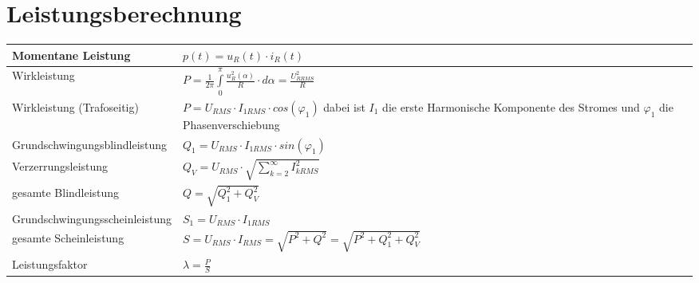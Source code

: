 \section{Leistungsberechnung}
\begin{tabu}{|p{0.3\textwidth}|p{0.6\textwidth}|}
  \hline
  Momentane Leistung
  	& $p(t) = u_{R}(t) \cdot i_{R}(t)$\\
  \hline
  Wirkleistung
  	& $P = \frac{1}{2\pi}\int\limits_{0}^{\pi}\frac{u_{R}^2(\alpha)}{R} \cdot d\alpha = \frac{U_{R RMS}^2}{R}$\\
  \hline
  Wirkleistung (Trafoseitig)
  	& $P = U_{RMS} \cdot I_{1RMS} \cdot cos(\varphi_{1})$ \newline
  		dabei ist $I_{1}$ die erste Harmonische Komponente des Stromes \newline
  		und $\varphi_{1}$ die Phasenverschiebung\\
  \hline
  Grundschwingungsblindleistung
  	& $Q_{1} = U_{RMS} \cdot I_{1RMS} \cdot sin(\varphi_{1})$\\
  \hline
  Verzerrungsleistung
  	& $Q_{V} =  U_{RMS} \cdot \sqrt{\sum\limits_{k = 2}^{\infty}I_{kRMS}^2}$\\
  \hline
  gesamte Blindleistung
  	& $Q = \sqrt{Q_{1}^2 + Q_{V}^2}$\\
  \hline
  Grundschwingungsscheinleistung
  	& $S_{1} = U_{RMS} \cdot I_{1RMS}$\\
  \hline
  gesamte Scheinleistung
  	& $S = U_{RMS} \cdot I_{RMS} = \sqrt{P^2 + Q^2} = \sqrt{P^2 + Q_{1}^2 + Q_{V}^2}$\\
  \hline
  Leistungsfaktor
  	& $\lambda = \frac{P}{S}$\\
  \hline
\end{tabu}